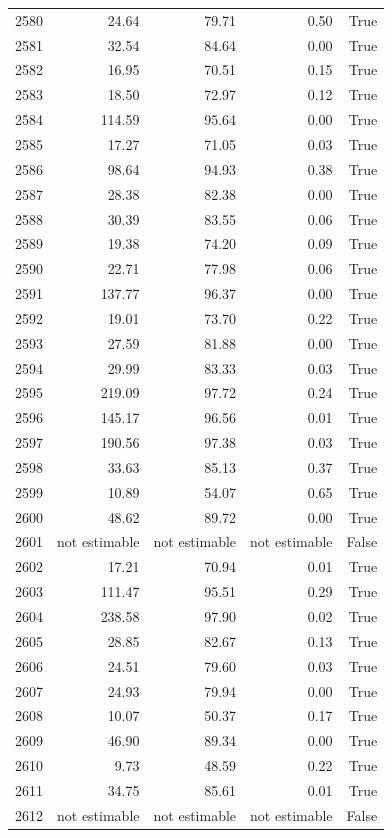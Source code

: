 \begin{longtable}{rrrrr}
2580 & 24.64 & 79.71 & 0.50 & True \\
2581 & 32.54 & 84.64 & 0.00 & True \\
2582 & 16.95 & 70.51 & 0.15 & True \\
2583 & 18.50 & 72.97 & 0.12 & True \\
2584 & 114.59 & 95.64 & 0.00 & True \\
2585 & 17.27 & 71.05 & 0.03 & True \\
2586 & 98.64 & 94.93 & 0.38 & True \\
2587 & 28.38 & 82.38 & 0.00 & True \\
2588 & 30.39 & 83.55 & 0.06 & True \\
2589 & 19.38 & 74.20 & 0.09 & True \\
2590 & 22.71 & 77.98 & 0.06 & True \\
2591 & 137.77 & 96.37 & 0.00 & True \\
2592 & 19.01 & 73.70 & 0.22 & True \\
2593 & 27.59 & 81.88 & 0.00 & True \\
2594 & 29.99 & 83.33 & 0.03 & True \\
2595 & 219.09 & 97.72 & 0.24 & True \\
2596 & 145.17 & 96.56 & 0.01 & True \\
2597 & 190.56 & 97.38 & 0.03 & True \\
2598 & 33.63 & 85.13 & 0.37 & True \\
2599 & 10.89 & 54.07 & 0.65 & True \\
2600 & 48.62 & 89.72 & 0.00 & True \\
2601 & not estimable & not estimable & not estimable & False \\
2602 & 17.21 & 70.94 & 0.01 & True \\
2603 & 111.47 & 95.51 & 0.29 & True \\
2604 & 238.58 & 97.90 & 0.02 & True \\
2605 & 28.85 & 82.67 & 0.13 & True \\
2606 & 24.51 & 79.60 & 0.03 & True \\
2607 & 24.93 & 79.94 & 0.00 & True \\
2608 & 10.07 & 50.37 & 0.17 & True \\
2609 & 46.90 & 89.34 & 0.00 & True \\
2610 & 9.73 & 48.59 & 0.22 & True \\
2611 & 34.75 & 85.61 & 0.01 & True \\
2612 & not estimable & not estimable & not estimable & False \\

\end{longtable}
